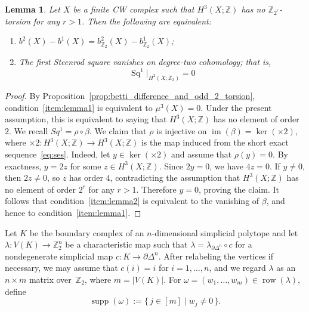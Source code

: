 \documentclass{amsart}
\newcommand{\Z}{\mathbb{Z}}
\newcommand{\supp}{\operatorname{supp}}
\DeclareMathOperator{\row}{row}
\DeclareMathOperator{\im}{im}
\DeclareMathOperator{\Sq}{Sq}
\theoremstyle{plain}
\newtheorem{lemma}[theorem]{Lemma}
\numberwithin{equation}{section}
\theoremstyle{definition}
\theoremstyle{remark}
\begin{document}
\begin{lemma}\label{lem:betti_difference_vs_Sq1}
    Let $X$ be a finite CW complex such that $H^3(X;\Z)$ has no $\Z_{2^r}$-torsion for any $r>1$. 
    Then the following are equivalent:
    \begin{enumerate}
        \item\label{item:lemma1} $b^2(X)-b^1(X)=b^2_{\Z_2}(X)-b^1_{\Z_2}(X)$;
        \item\label{item:lemma2} The first Steenrod square vanishes on degree-two cohomology; that is,
        $$
            \Sq^1\big|_{H^{2}(X;\Z_2)}=0
        $$
    \end{enumerate}
\end{lemma}
\begin{proof}
    By Proposition~\ref{prop:betti_difference_and_odd_2_torsion}, condition~\eqref{item:lemma1} is equivalent to $\mu^{3}(X)=0$.
    Under the present assumption, this is equivalent to saying that $H^{3}(X;\Z)$ has no element of order $2$.
    We recall $Sq^1=\rho\circ\beta$.
    We claim that $\rho$ is injective on $\im(\beta)=\ker(\times 2)$, where $\times 2\colon H^{3}(X;\Z)\to H^{3}(X;\Z)$ is the map induced from the short exact sequence~\eqref{eq:ses}.     
    Indeed, let $y\in \ker(\times 2)$ and assume that $\rho(y)=0$. 
    By exactness, $y=2z$ for some $z\in H^{3}(X;\Z)$. 
    Since $2y=0$, we have $4z=0$. 
    If $y\neq 0$, then $2z\neq 0$, so $z$ has order $4$, contradicting the assumption that $H^{3}(X;\Z)$ has no element of order $2^r$ for any $r>1$. 
    Therefore $y=0$, proving the claim.
    It follows that condition~\eqref{item:lemma2} is equivalent to the vanishing of $\beta$, and hence to condition~\eqref{item:lemma1}.
\end{proof}

Let $K$ be the boundary complex of an $n$-dimensional simplicial polytope and let $\lambda \colon V(K) \to \Z_2^n$ be a characteristic map such that $\lambda = \lambda_{\partial \Delta^n} \circ c$ for a nondegenerate simplicial map $c \colon K\longrightarrow \partial\Delta^n$.
After relabeling the vertices if necessary, we may assume that $c(i)=i$ for $i=1,\dots,n$, and we regard $\lambda$ as an $n\times m$ matrix over~$\Z_2$, where $m=|V(K)|$.
For $\omega=(w_1,\dots,w_m)\in \row(\lambda)$, define
$$
    \supp(\omega):=\{\,j\in [m]\mid w_j\neq 0\,\}.
$$
\end{document}
